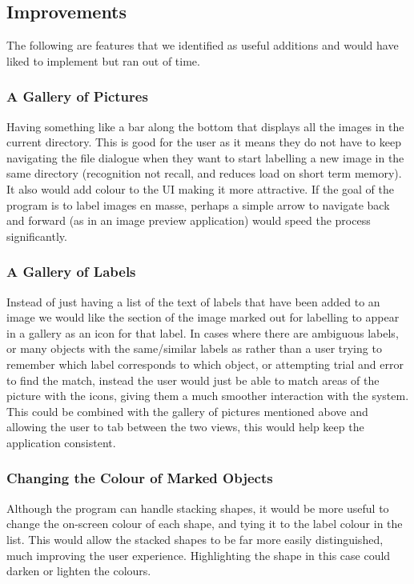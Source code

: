 \documentclass[a4paper,11pt,oneside]{article}
\begin{document}
\subsection{Improvements}
The following are features that we identified as useful additions and would have
liked to implement but ran out of time.

\subsubsection{A Gallery of Pictures} 
Having something like a bar along the bottom that displays all the images in the
current directory.  This is good for the user as it means they do not have to
keep navigating the file dialogue when they want to start labelling a new image
in the same directory (recognition not recall, and reduces load on short term
memory).  It also would add colour to the UI making it more attractive. If the
goal of the program is to label images en masse, perhaps a simple arrow to
navigate back and forward (as in an image preview application) would speed the
process significantly.

\subsubsection{A Gallery of Labels}
Instead of just having a list of the text of labels that have been added to an
image we would like the section of the image marked out for labelling to appear
in a gallery as an icon for that label.  In cases where there are ambiguous
labels, or many objects with the same/similar labels as rather than a user
trying to remember which label corresponds to which object, or attempting trial
and error to find the match, instead the user would just be able to match areas
of the picture with the icons, giving them a much smoother interaction with the
system.  This could be combined with the gallery of pictures mentioned above and
allowing the user to tab between the two views, this would help keep the
application consistent.

\subsubsection{Changing the Colour of Marked Objects}
Although the program can handle stacking shapes, it would be more useful to
change the on-screen colour of each shape, and tying it to the label colour in
the list.  This would allow the stacked shapes to be far more easily distinguished,
much improving the user experience. Highlighting the shape in this case could
darken or lighten the colours.
\end{document}
